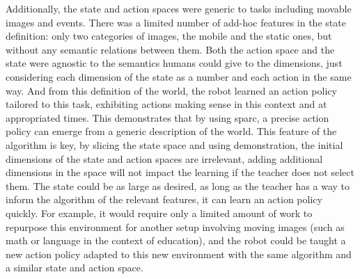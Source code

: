 Additionally, the state and action spaces were generic to tasks including movable images and events. There was a limited number of add-hoc features in the state definition: only two categories of images, the mobile and the static ones, but without any semantic relations between them. Both the action space and the state were agnostic to the semantics humans could give to the dimensions, just considering each dimension of the state as a number and each action in the same way. And from this definition of the world, the robot learned an action policy tailored to this task, exhibiting actions making sense in this context and at appropriated times. This demonstrates that by using \gls{sparc}, a precise action policy can emerge from a generic description of the world. This feature of the algorithm is key, by slicing the state space and using demonstration, the initial dimensions of the state and action spaces are irrelevant, adding additional dimensions in the space will not impact the learning if the teacher does not select them. The state could be as large as desired, as long as the teacher has a way to inform the algorithm of the relevant features, it can learn an action policy quickly. For example, it would require only a limited amount of work to repurpose this environment for another setup involving moving images (such as math or language in the context of education), and the robot could be taught a new action policy adapted to this new environment with the same algorithm and a similar state and action space. 






